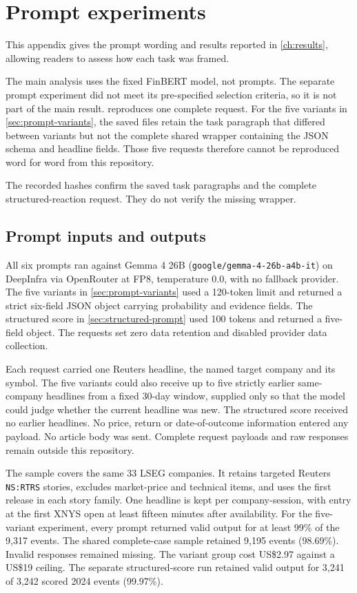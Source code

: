 \chapter{Prompt experiments}
\label{app:prompts}

This appendix gives the prompt wording and results reported in
\cref{ch:results}, allowing readers to assess how each task was framed.

The main analysis uses the fixed FinBERT model, not prompts. The separate
prompt experiment did not meet its pre-specified selection criteria, so it is
not part of the main result.
 reproduces one complete request. For the five
variants in \cref{sec:prompt-variants}, the saved files retain the task paragraph
that differed between variants but not the complete shared wrapper containing the
JSON schema and headline fields. Those five requests therefore cannot be
reproduced word for word from this repository.

The recorded hashes confirm the saved task paragraphs and the complete
structured-reaction request. They do not verify the missing wrapper.

\section{Prompt inputs and outputs}

All six prompts ran against Gemma 4 26B (\texttt{google/gemma-4-26b-a4b-it}) on
DeepInfra via OpenRouter at FP8, temperature 0.0, with no fallback provider. The
five variants in \cref{sec:prompt-variants} used a 120-token limit and returned
a strict six-field JSON object carrying probability and evidence fields. The
structured score in \cref{sec:structured-prompt} used 100 tokens and returned a
five-field object. The requests set zero data retention and disabled provider
data collection.

Each request carried one Reuters headline, the named target company and its
symbol. The five variants could also receive up to five strictly earlier
same-company headlines from a fixed 30-day window, supplied only so that the
model could judge whether the current headline was new. The structured score
received no earlier headlines. No price, return or date-of-outcome
information entered any payload. No article body was sent. Complete request
payloads and raw responses remain outside this repository.

The sample covers the same 33 LSEG companies. It retains targeted Reuters
\texttt{NS:RTRS} stories, excludes market-price and technical items, and uses the
first release in each story family. One headline is kept per company-session,
with entry at the first XNYS open at least fifteen minutes after availability.
For the five-variant experiment, every prompt returned valid output for at least
99\% of the 9,317 events. The shared complete-case sample retained 9,195 events
(98.69\%). Invalid responses remained missing. The variant group cost US\$2.97
against a US\$19 ceiling. The separate structured-score run retained valid output
for 3,241 of 3,242 scored 2024 events (99.97\%).

